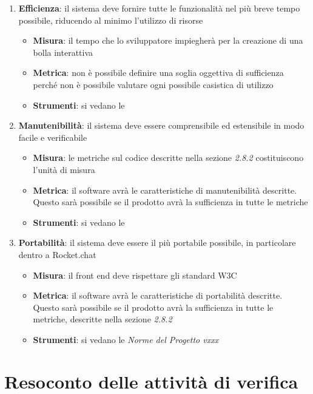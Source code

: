 {\begin{enumerate}
  \item \textbf{Efficienza}: il sistema deve fornire tutte le funzionalità nel più breve tempo possibile,
    riducendo al minimo l'utilizzo di risorse
    \begin{itemize}
    \item \textbf{Misura}: il tempo che lo sviluppatore impiegherà per la creazione di una bolla interattiva
    \item \textbf{Metrica}: non è possibile definire una soglia oggettiva di sufficienza perché non è possibile valutare ogni possibile casistica di utilizzo
    \item \textbf{Strumenti}: si vedano le  \emph{\normediprogetto}
    \end{itemize}

  \item \textbf{Manutenibilità}: il sistema deve essere comprensibile ed estensibile in modo facile e verificabile
    \begin{itemize}
    \item \textbf{Misura}: le metriche sul codice descritte nella sezione \emph{2.8.2}
      costituiscono l'unità di misura
    \item \textbf{Metrica}: il software avrà le caratteristiche di manutenibilità descritte. Questo sarà possibile se il prodotto avrà la sufficienza in tutte le metriche
    \item \textbf{Strumenti}: si vedano le  \emph{\normediprogetto}
    \end{itemize}

  \item \textbf{Portabilità}: il sistema deve essere il più portabile possibile, in particolare dentro a Rocket.chat
    \begin{itemize}
    \item \textbf{Misura}: il front end deve rispettare gli standard W3C
    \item \textbf{Metrica}: il software avrà le caratteristiche di
      portabilità descritte. Questo sarà possibile se il prodotto
      avrà la sufficienza in tutte le metriche, descritte nella sezione \emph{2.8.2}
    \item \textbf{Strumenti}: si vedano le \emph{Norme del Progetto vxxx}
    \end{itemize}
  \end{enumerate}




  \section{Resoconto delle attività di verifica}

}
